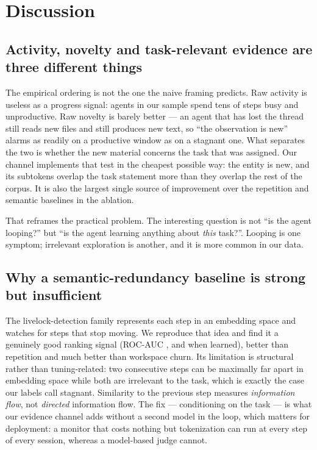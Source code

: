 \section{Discussion}
\label{sec:discussion}

\subsection{Activity, novelty and task-relevant evidence are three different things}
The empirical ordering is not the one the naive framing predicts. Raw activity is useless as a progress
signal: agents in our sample spend tens of steps busy and unproductive. Raw novelty is barely better --- an
agent that has lost the thread still reads new files and still produces new text, so ``the observation is
new'' alarms as readily on a productive window as on a stagnant one. What separates the two is whether the
new material concerns the task that was assigned. Our \evid{} channel implements that test in the cheapest
possible way: the entity is new, and its subtokens overlap the task statement more than they overlap the
rest of the corpus. It is also the largest single source of improvement over the repetition and semantic
baselines in the ablation.

That reframes the practical problem. The interesting question is not ``is the agent looping?'' but ``is the
agent learning anything about \emph{this} task?''. Looping is one symptom; irrelevant exploration is
another, and it is more common in our data.

\subsection{Why a semantic-redundancy baseline is strong but insufficient}
The livelock-detection family represents each step in an embedding space and watches for steps that stop
moving. We reproduce that idea and find it a genuinely good ranking signal (ROC-AUC \paucBFoursemantic{},
and \paucLsem{} when learned), better than repetition and much better than workspace churn. Its limitation
is structural rather than tuning-related: two consecutive steps can be maximally far apart in embedding
space while both are irrelevant to the task, which is exactly the case our labels call stagnant.
Similarity to the previous step measures \emph{information flow}, not \emph{directed} information flow. The
fix --- conditioning on the task --- is what our evidence channel adds without a second model in the loop,
which matters for deployment: a monitor that costs nothing but tokenization can run at every step of every
session, whereas a model-based judge cannot.

